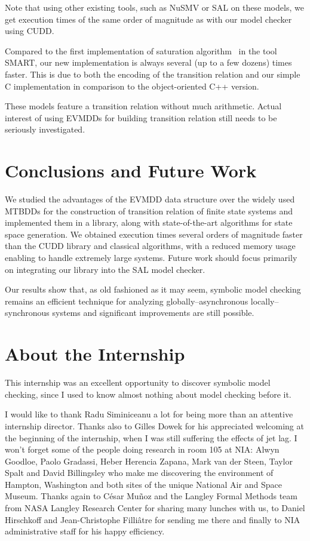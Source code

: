 \documentclass[a4paper,oneside,11pt,pdftex]{llncs}
\begin{document}
Note that using other existing tools, such as NuSMV or SAL on these models, we get execution times of the same order of magnitude as with our model checker using CUDD.

Compared to the first implementation of saturation algorithm~\cite{Saturation2001} in the tool SMART, our new implementation is always several (up to a few dozens) times faster.
This is due to both the encoding of the transition relation
and our simple C implementation in comparison to the object-oriented C++ version.

These models feature a transition relation without much arithmetic.
Actual interest of using EVMDDs for building transition relation
still needs to be seriously investigated.

\section{Conclusions and Future Work}

We studied the advantages of the EVMDD data structure
over the widely used MTBDDs for the construction
of transition relation of finite state systems
and implemented them in a library, along with
state-of-the-art algorithms for state space generation.
We obtained execution times several orders of magnitude faster
than the CUDD library and classical algorithms,
with a reduced memory usage enabling to handle extremely large systems.
Future work should focus primarily on integrating our library
into the SAL model checker.

Our results show that, as old fashioned as it may seem,
symbolic model checking remains an efficient technique
for analyzing globally--asynchronous locally--synchronous systems and
significant improvements are still possible.


\section{About the Internship}

This internship was an excellent opportunity to discover
symbolic model checking, since I used to know almost nothing
about model checking before it.

I would like to thank Radu Siminiceanu a lot for being
more than an attentive internship director.
Thanks also to Gilles Dowek for his appreciated welcoming
at the beginning of the internship, when I was still suffering
the effects of jet lag. I won't forget some of the people
doing research in room 105 at NIA: Alwyn Goodloe,
Paolo Gradassi, Heber Herencia Zapana, Mark van der Steen,
Taylor Spalt and David Billingsley who make me discovering
the environment of Hampton, Washington and both sites
of the unique National Air and Space Museum.
Thanks again to César Mu\~{n}oz and the Langley Formal Methods
team from NASA Langley Research Center for sharing many lunches
with us, to Daniel Hirschkoff and Jean-Christophe Filliâtre
for sending me there and finally to NIA administrative staff
for his happy efficiency.



\end{document}
